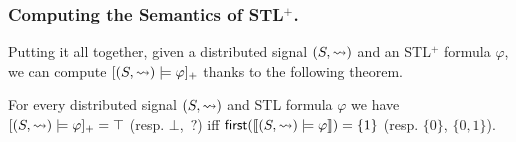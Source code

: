 \subsubsection{Computing the Semantics of STL$^+$.}

Putting it all together, given a distributed signal $(S, {\rightsquigarrow})$ and an STL$^+$ formula $\varphi$, we can compute $[(S,{\rightsquigarrow}) \models \varphi]_+$ thanks to the following theorem.

\begin{theorem} \label{cl:algo}
	For every distributed signal $(S,{\rightsquigarrow})$ and STL formula $\varphi$ we have $[(S,{\rightsquigarrow}) \models \varphi]_+ = \top$ (resp. $\bot$, ${\,?}$) iff $\textsf{first}(\llbracket (S, {\rightsquigarrow}) \models \varphi \rrbracket) = \{1\}$ (resp. $\{0\}$, $\{0,1\}$).
\end{theorem}

%	
%	
%	
%	


